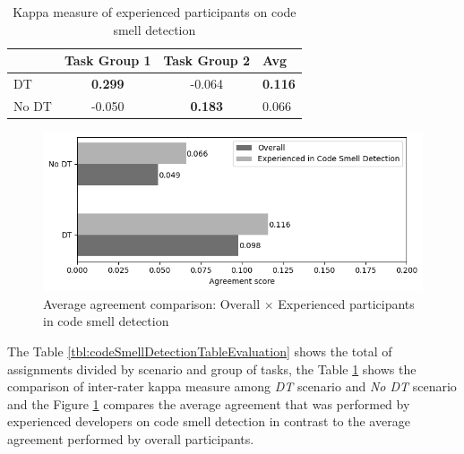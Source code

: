 \begin{table}[ht]
\centering
\setlength{\extrarowheight}{0pt}
\addtolength{\extrarowheight}{\aboverulesep}
\addtolength{\extrarowheight}{\belowrulesep}
\setlength{\aboverulesep}{0pt}
\setlength{\belowrulesep}{0pt}
\begin{tabular}{lccl} 
\toprule
 & \multicolumn{1}{l}{Task Group 1} & \multicolumn{1}{l}{Task Group 2} & {\cellcolor[rgb]{0.753,0.753,0.753}}Avg \\ 
\midrule
DT & \textbf{0.299} & -0.064 & {\cellcolor[rgb]{0.753,0.753,0.753}}\textbf{0.116} \\
No DT & -0.050 & \textbf{0.183} & {\cellcolor[rgb]{0.753,0.753,0.753}}0.066 \\
\bottomrule
\end{tabular}
\caption{Kappa measure of experienced participants on code smell detection}
\label{tbl:codeSmellDetectionKappaValues}
\end{table}

\begin{figure}[ht]
\centering
\includegraphics[width=15cm]{figures/overallXcodeSmellIdentification.png}
\caption{Average agreement comparison: Overall $\times$ Experienced participants in code smell detection}
\label{fig:overallxcodeSmellDetection}
\end{figure}

The Table \ref{tbl:codeSmellDetectionTableEvaluation} shows the total of assignments divided by scenario and group of tasks, the Table \ref{tbl:codeSmellDetectionKappaValues} shows the comparison of inter-rater kappa measure among  \textit{DT} scenario and  \textit{No DT} scenario and the Figure \ref{fig:overallxcodeSmellDetection} compares the average agreement that was performed by experienced developers on code smell detection in contrast to the average agreement performed by overall participants. 

